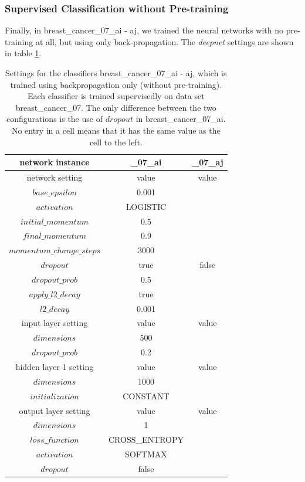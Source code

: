 \subsubsection{Supervised Classification without Pre-training}

Finally, in breast\_cancer\_07\_ai
- aj, we trained the neural networks with no pre-training at all,
but using only back-propagation. The \emph{deepnet} settings are shown
in table \ref{tab:deepnet-settings-for-breast_cancer_07_ai-aj}.

\begin{table}
\begin{centering}
\begin{tabular}{|c|c|c|}
\hline 
network instance & \_07\_ai & \_07\_aj\tabularnewline
\hline 
\hline 
network setting & value & value\tabularnewline
\hline 
\hline 
$base\textrm{\_}epsilon$ & 0.001 & \tabularnewline
\hline 
$activation$ & LOGISTIC & \tabularnewline
\hline 
$initial\textrm{\_}momentum$ & 0.5 & \tabularnewline
\hline 
$final\_momentum$ & 0.9 & \tabularnewline
\hline 
$momentum\textrm{\_}change\textrm{\_}steps$ & 3000 & \tabularnewline
\hline 
$dropout$ & true & false\tabularnewline
\hline 
$dropout\textrm{\_}prob$ & 0.5 & \tabularnewline
\hline 
$apply\textrm{\_}l2\textrm{\_}decay$ & true & \tabularnewline
\hline 
$l2\textrm{\_}decay$ & 0.001 & \tabularnewline
\hline 
\hline 
input layer setting & value & value\tabularnewline
\hline 
\hline 
$dimensions$ & 500 & \tabularnewline
\hline 
$dropout\textrm{\_}prob$ & 0.2 & \tabularnewline
\hline 
\hline 
hidden layer 1 setting & value & value\tabularnewline
\hline 
\hline 
$dimensions$ & 1000 & \tabularnewline
\hline 
$initialization$ & CONSTANT & \tabularnewline
\hline 
\hline 
output layer setting & value & value\tabularnewline
\hline 
\hline 
$dimensions$ & 1 & \tabularnewline
\hline 
$loss\textrm{\_}function$ & CROSS\_ENTROPY & \tabularnewline
\hline 
$activation$ & SOFTMAX & \tabularnewline
\hline 
$dropout$ & false & \tabularnewline
\hline 
\end{tabular}
\par\end{centering}
\caption[Settings for the classifiers breast\_cancer\_07\_ai - aj.]{\label{tab:deepnet-settings-for-breast_cancer_07_ai-aj}Settings
for the classifiers breast\_cancer\_07\_ai - aj, which is trained
using backpropagation only (without pre-training). Each classifier
is trained supervisedly on data set breast\_cancer\_07. The only difference
between the two configurations is the use of $dropout$ in breast\_cancer\_07\_ai.
No entry in a cell means that it has the same value as the cell to
the left.}
\end{table}

